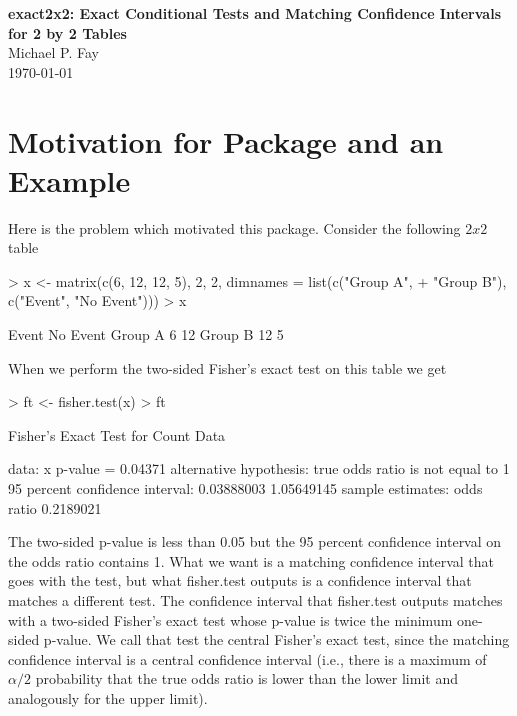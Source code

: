 \documentclass[12pt]{article}
\begin{document}
\begin{center}
{\Large \bf exact2x2: Exact Conditional Tests and Matching Confidence Intervals for 2 by 2 Tables} \\
Michael P. Fay \\
\today
\end{center}



\section{Motivation for Package and an Example}
\label{sec-overview}

Here is the problem which motivated this package. Consider the following $2x2$ table
\begin{Schunk}
\begin{Sinput}
> x <- matrix(c(6, 12, 12, 5), 2, 2, dimnames = list(c("Group A", 
+     "Group B"), c("Event", "No Event")))
> x
\end{Sinput}
\begin{Soutput}
        Event No Event
Group A     6       12
Group B    12        5
\end{Soutput}
\end{Schunk}
When we perform the two-sided Fisher's exact test on this table we get
\begin{Schunk}
\begin{Sinput}
> ft <- fisher.test(x)
> ft
\end{Sinput}
\begin{Soutput}
	Fisher's Exact Test for Count Data

data:  x 
p-value = 0.04371
alternative hypothesis: true odds ratio is not equal to 1 
95 percent confidence interval:
 0.03888003 1.05649145 
sample estimates:
odds ratio 
 0.2189021 
\end{Soutput}
\end{Schunk}
The two-sided p-value is less than 0.05 but the 95 percent confidence interval on the odds ratio contains 1. 
What we want is a matching confidence 
interval that goes with the test, but what fisher.test outputs is a confidence interval that matches a different test. The confidence interval 
that fisher.test outputs matches with a two-sided Fisher's exact test whose p-value is twice the minimum one-sided p-value. 
We call that test the central 
Fisher's exact test, since the matching confidence interval is a central confidence interval (i.e., there is a maximum of $\alpha/2$ probability 
that the true odds ratio is lower than the lower limit and analogously for the upper limit). 
\end{document}
